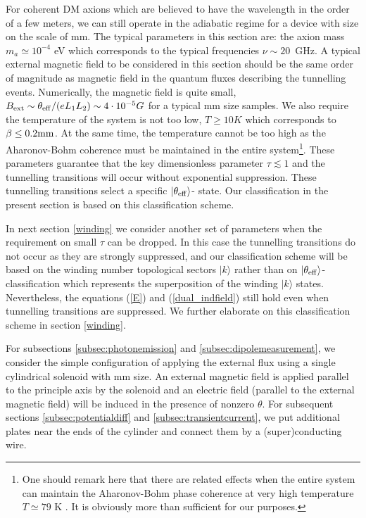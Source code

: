 \documentclass[ twocolumn,aps,prd,   
               preprintnumbers,numbers,sort&compress,nofootinbib,
                            showpacs,superscriptaddress,
               colorlinks,
               linkcolor=blue,   
               citecolor=blue]{revtex4-1}   \newcommand{\exclude}[1]{}
\def\ra{\rangle}
\begin{document}
For coherent DM axions which are believed to have the wavelength in the order of a few meters, we can still operate in the adiabatic regime for a device with size on the scale of mm. The typical parameters in this section are: the axion mass $m_a\simeq 10^{-4}$ eV which corresponds to the typical frequencies $\nu\sim 20 $~GHz.  A typical  external magnetic field to be considered in this section  should be the same order of magnitude as 
magnetic field in the quantum fluxes describing the tunnelling events. Numerically, the magnetic field is   quite small, 
$B_{\rm ext}\sim \theta_{\rm eff}/(eL_1L_2)\sim 4\cdot 10^{-5} G$ for a typical mm size  samples. We also require the temperature of the system is not too low, $T \geq   10K$ which corresponds to  $\beta \leq  0.2 {\rm mm}$. At the same time, the    temperature cannot be too high as  the Aharonov-Bohm coherence must be maintained in the entire system\footnote{\label{AB}One should remark here that there are related effects  when  the entire system  can   maintain   the  Aharonov-Bohm phase coherence  at    very  high temperature $T\simeq  79 $ K \cite{persistent-temp}. It is obviously more than sufficient   for our purposes.}. 
 These parameters guarantee that the key dimensionless 
parameter  $\tau \lesssim 1$ and the tunnelling transitions  will  occur without exponential suppression. These tunnelling transitions select a specific 
$|\theta_{\rm eff}\ra $- state. Our classification in the present section is based on this classification scheme.  

In next section \ref{winding} we consider another set of parameters when the requirement on small $\tau$ can be dropped. In this case the tunnelling transitions do not occur as they are strongly suppressed, and our classification scheme will be based on the winding number topological  sectors $|k\ra$ rather than on $|\theta_{\rm eff}\ra $- classification which represents the superposition of the winding $|k\ra$ states. Nevertheless, the equations (\ref{E})
and (\ref{dual_indfield}) still hold even when tunnelling transitions are suppressed. We further elaborate on this classification scheme in section   \ref{winding}. 


\exclude{
is in the few GHz range with $\dot{\theta} \sim 10^{-6} eV \ll \Delta E \approx 10^{-3} \rm eV \sim 10^{-5} \rm eV$, where $\Delta E$ is the gap in the effective transition energy \cite{Yao:2016bps} in the mm range. 
}
For subsections \ref{subsec:photonemission} and \ref{subsec:dipolemeasurement}, we consider the simple configuration of applying the external flux using a single cylindrical solenoid with mm size. An external magnetic field is applied parallel to the principle axis by the solenoid and an electric field (parallel to the external magnetic field) will be  induced in the presence of nonzero $\theta$.  For subsequent sections \ref{subsec:potentialdiff} and \ref{subsec:transientcurrent}, we put additional plates near the ends of the cylinder and connect them by a (super)conducting wire. 
\end{document}
